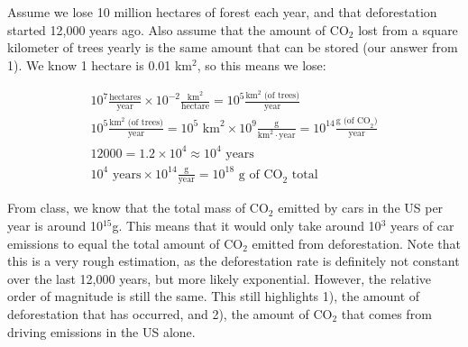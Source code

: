 \documentclass[11pt,a4paper,margin=1in]{article}
\begin{document}
\section{}
\begin{flushleft}
    Assume we lose 10 million hectares of forest each year, and that deforestation 
    started 12,000 years ago. Also assume that the amount of CO$_2$ lost from a
    square kilometer of trees yearly is the same amount that can be stored 
    (our answer from 1). We know 1 hectare is 0.01 km$^2$, so this means we lose:
\end{flushleft}
\begin{gather*}
    10^7 \frac{\text{hectares}}{\text{year}} \times 10^{-2} 
        \frac{\text{km}^2}{\text{hectare}} = 10^5 \frac{\text{km}^2 
            \text{ (of trees)}}{\text{year}}\\
    10^5 \frac{\text{km}^2 \text{ (of trees)}}{\text{year}} = 
        10^5 \text{ km}^2 \times 10^9 \frac{\text{g}}{\text{km}^2 \cdot \text{year}} 
        = 10^{14} \frac{\text{g (of CO}_2)}{\text{year}}\\
    12000 = 1.2 \times 10^4 \approx 10^4 \text{ years}\\
    10^4 \text{ years} \times 10^{14} \frac{\text{g}}{\text{year}} = 10^{18} 
        \text{ g of CO}_2 \text { total}
\end{gather*}
\begin{flushleft}
    From class, we know that the total mass of CO$_2$ emitted by cars in the US
    per year is around 10$^{15}$g. This means that it would only take around 10$^3$ 
    years of car emissions to equal the total amount of CO$_2$ emitted from deforestation.
    Note that this is a very rough estimation, as the deforestation rate is definitely
    not constant over the last 12,000 years, but more likely exponential. However,
    the relative order of magnitude is still the same. This still highlights 1),
    the amount of deforestation that has occurred, and 2), the amount of CO$_2$
    that comes from driving emissions in the US alone. 
\end{flushleft}
\end{document}

